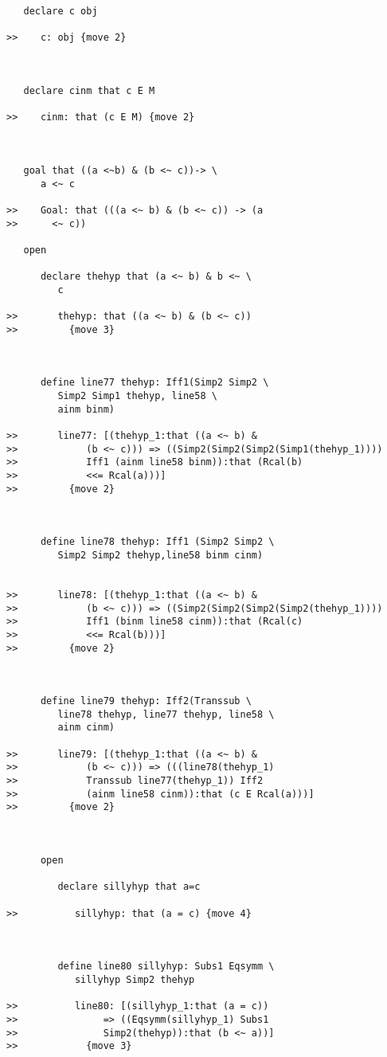 \documentclass[12pt]{article}
\begin{document}
\begin{verbatim}
   declare c obj

>>    c: obj {move 2}



   declare cinm that c E M

>>    cinm: that (c E M) {move 2}



   goal that ((a <~b) & (b <~ c))-> \
      a <~ c

>>    Goal: that (((a <~ b) & (b <~ c)) -> (a
>>      <~ c))

   open

      declare thehyp that (a <~ b) & b <~ \
         c

>>       thehyp: that ((a <~ b) & (b <~ c))
>>         {move 3}



      define line77 thehyp: Iff1(Simp2 Simp2 \
         Simp2 Simp1 thehyp, line58 \
         ainm binm)

>>       line77: [(thehyp_1:that ((a <~ b) &
>>            (b <~ c))) => ((Simp2(Simp2(Simp2(Simp1(thehyp_1))))
>>            Iff1 (ainm line58 binm)):that (Rcal(b)
>>            <<= Rcal(a)))]
>>         {move 2}



      define line78 thehyp: Iff1 (Simp2 Simp2 \
         Simp2 Simp2 thehyp,line58 binm cinm)


>>       line78: [(thehyp_1:that ((a <~ b) &
>>            (b <~ c))) => ((Simp2(Simp2(Simp2(Simp2(thehyp_1))))
>>            Iff1 (binm line58 cinm)):that (Rcal(c)
>>            <<= Rcal(b)))]
>>         {move 2}



      define line79 thehyp: Iff2(Transsub \
         line78 thehyp, line77 thehyp, line58 \
         ainm cinm)

>>       line79: [(thehyp_1:that ((a <~ b) &
>>            (b <~ c))) => (((line78(thehyp_1)
>>            Transsub line77(thehyp_1)) Iff2
>>            (ainm line58 cinm)):that (c E Rcal(a)))]
>>         {move 2}



      open

         declare sillyhyp that a=c

>>          sillyhyp: that (a = c) {move 4}



         define line80 sillyhyp: Subs1 Eqsymm \
            sillyhyp Simp2 thehyp

>>          line80: [(sillyhyp_1:that (a = c))
>>               => ((Eqsymm(sillyhyp_1) Subs1
>>               Simp2(thehyp)):that (b <~ a))]
>>            {move 3}




\end{verbatim}
\end{document}
